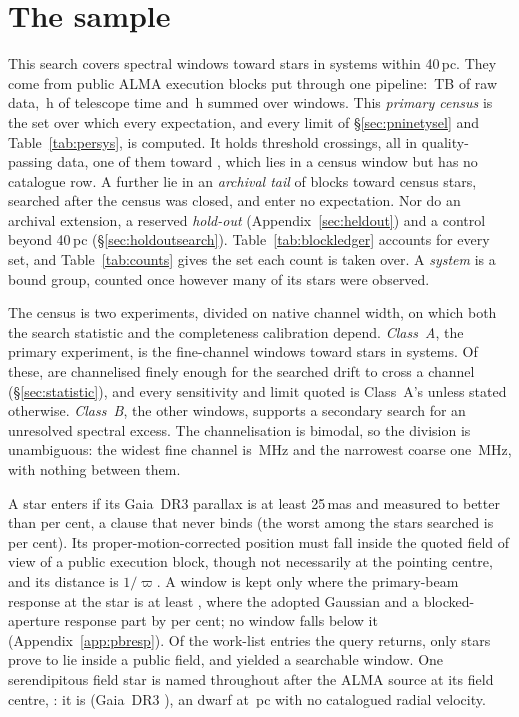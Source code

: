 \section{The sample}
\label{sec:sample}

This search covers \NWindows{} spectral windows toward \NStars{} stars in
\NSystems{} systems within 40\,pc. They come from \NEB{} public ALMA execution
blocks put through one pipeline: \TotalDataTB\,TB of raw data, \StTelHours\,h
of telescope time and \LdgCensusHours\,h summed over windows. This
\emph{primary census} is the set over which every expectation, and every
limit of \S\ref{sec:pninetysel} and Table~\ref{tab:persys}, is computed. It
holds \CsNCross{} threshold crossings, all in quality-passing data, one of them
toward \CtUncatStar, which lies in a census window but has no catalogue row.
A further \CeNTailCross{}
lie in an \emph{archival tail} of \LdgExtTail{} blocks toward
\LdgTailStars{} census stars, searched after the census was closed, and enter
no expectation. Nor do an archival extension, a reserved \emph{hold-out}
(Appendix~\ref{sec:heldout}) and a control beyond 40\,pc
(\S\ref{sec:holdoutsearch}). Table~\ref{tab:blockledger} accounts for every
set, and Table~\ref{tab:counts} gives the set each count is taken over. A
\emph{system} is a bound group, counted once however many of its stars were
observed.

The census is two experiments, divided on native channel width, on which both
the search statistic and the completeness calibration depend.
\emph{Class~A}, the primary experiment, is the \NWinA{} fine-channel windows
toward \LdgClassAStars{} stars in \NSysClassA{} systems. Of these, \EtaDriftAOk{}
are channelised finely enough for the searched drift to cross a channel
(\S\ref{sec:statistic}), and every sensitivity and limit quoted is Class~A's
unless stated otherwise. \emph{Class~B}, the other \NWinB{} windows, supports a
secondary search for an unresolved spectral excess. The channelisation is
bimodal, so the division is unambiguous: the widest fine channel is
\ScChanFineMaxMHz\,MHz and the narrowest coarse one \ScChanCoarseMinMHz\,MHz,
with nothing between them.

A star enters if its Gaia~DR3 parallax is at least 25\,mas and measured to
better than \PlxAdqlPct{} per cent, a clause that never binds (the worst among
the stars searched is \SfPlxWorstPct{} per cent). Its proper-motion-corrected
position must fall inside the quoted field of view of a public execution
block, though not necessarily at the pointing centre, and its distance is
$1/\varpi$. A window is kept only where the primary-beam response at the star
is at least \BmFloorResp, where the adopted Gaussian and a blocked-aperture
response part by \BmFloorTolPct{} per cent; no window falls below it
(Appendix~\ref{app:pbresp}). Of the \NCensus{} work-list entries the query
returns, only \NGenuinelyCovered{} stars prove to lie inside a public field,
and \NStars{} yielded a searchable window. One serendipitous field star is
named throughout after the ALMA source at its field centre, \BkAlmaName: it is
\BkAlmaTwoMass{} (Gaia~DR3 \BkAlmaGaia), an \BkAlmaSpType{} dwarf at \BkAlmaDistPc\,pc with no
catalogued radial velocity.


